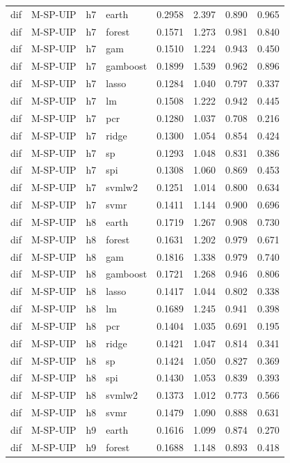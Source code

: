 \begin{ThreePartTable}
\begin{longtable}[t]{llclcccc}
dif & M-SP-UIP & h7 & earth & 0.2958 & 2.397 & 0.890 & 0.965\\
dif & M-SP-UIP & h7 & forest & 0.1571 & 1.273 & 0.981 & 0.840\\
dif & M-SP-UIP & h7 & gam & 0.1510 & 1.224 & 0.943 & 0.450\\
dif & M-SP-UIP & h7 & gamboost & 0.1899 & 1.539 & 0.962 & 0.896\\
dif & M-SP-UIP & h7 & lasso & 0.1284 & 1.040 & 0.797 & 0.337\\
dif & M-SP-UIP & h7 & lm & 0.1508 & 1.222 & 0.942 & 0.445\\
dif & M-SP-UIP & h7 & pcr & 0.1280 & 1.037 & 0.708 & 0.216\\
dif & M-SP-UIP & h7 & ridge & 0.1300 & 1.054 & 0.854 & 0.424\\
dif & M-SP-UIP & h7 & sp & 0.1293 & 1.048 & 0.831 & 0.386\\
dif & M-SP-UIP & h7 & spi & 0.1308 & 1.060 & 0.869 & 0.453\\
dif & M-SP-UIP & h7 & svmlw2 & 0.1251 & 1.014 & 0.800 & 0.634\\
dif & M-SP-UIP & h7 & svmr & 0.1411 & 1.144 & 0.900 & 0.696\\
\addlinespace
dif & M-SP-UIP & h8 & earth & 0.1719 & 1.267 & 0.908 & 0.730\\
dif & M-SP-UIP & h8 & forest & 0.1631 & 1.202 & 0.979 & 0.671\\
dif & M-SP-UIP & h8 & gam & 0.1816 & 1.338 & 0.979 & 0.740\\
dif & M-SP-UIP & h8 & gamboost & 0.1721 & 1.268 & 0.946 & 0.806\\
dif & M-SP-UIP & h8 & lasso & 0.1417 & 1.044 & 0.802 & 0.338\\
dif & M-SP-UIP & h8 & lm & 0.1689 & 1.245 & 0.941 & 0.398\\
dif & M-SP-UIP & h8 & pcr & 0.1404 & 1.035 & 0.691 & 0.195\\
dif & M-SP-UIP & h8 & ridge & 0.1421 & 1.047 & 0.814 & 0.341\\
dif & M-SP-UIP & h8 & sp & 0.1424 & 1.050 & 0.827 & 0.369\\
dif & M-SP-UIP & h8 & spi & 0.1430 & 1.053 & 0.839 & 0.393\\
dif & M-SP-UIP & h8 & svmlw2 & 0.1373 & 1.012 & 0.773 & 0.566\\
dif & M-SP-UIP & h8 & svmr & 0.1479 & 1.090 & 0.888 & 0.631\\
\addlinespace
dif & M-SP-UIP & h9 & earth & 0.1616 & 1.099 & 0.874 & 0.270\\
dif & M-SP-UIP & h9 & forest & 0.1688 & 1.148 & 0.893 & 0.418\\

\end{longtable}
\end{ThreePartTable}
